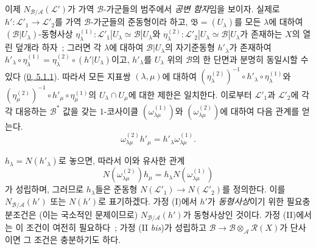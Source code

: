 \begin{env}[6.5.3]
\label{II.6.5.3-ko}
이제 $N_{\mathcal{B}/\mathcal{A}}(\mathcal{L}')$가 가역
$\mathcal{B}$-가군들의 범주에서 \emph{공변 함자}임을 보이자. 실제로
$h':\mathcal{L}'_1\to\mathcal{L}'_2$를 가역 $\mathcal{B}$-가군들의
준동형이라 하고, $\mathfrak{B}=(U_\lambda)$를 모든 $\lambda$에 대하여
$(\mathcal{B}|U_\lambda)$-동형사상
$\eta^{(1)}_\lambda:\mathcal{L}'_1|U_\lambda\simeq\mathcal{B}|U_\lambda$와
$\eta^{(2)}_\lambda:\mathcal{L}'_2|U_\lambda\simeq\mathcal{B}|U_\lambda$가
존재하는 $X$의 열린 덮개라 하자~; 그러면 각 $\lambda$에 대하여
$\mathcal{B}|U_\lambda$의 자기준동형 $h'_\lambda$가 존재하여
$h'_\lambda\circ\eta^{(1)}_\lambda
=\eta^{(2)}_\lambda\circ(h'|U_\lambda)$이고, $h'_\lambda$를
$U_\lambda$ 위의 $\mathcal{B}$의 한 단면과 분명히 동일시할 수 있다
(\hyperref[0.5.1.1-ko]{0, 5.1.1}). 따라서 모든 지표쌍 $(\lambda,\mu)$에
대하여 $(\eta^{(2)}_\lambda)^{-1}\circ h'_\lambda\circ
\eta^{(1)}_\lambda$와 $(\eta^{(2)}_\mu)^{-1}\circ h'_\mu\circ
\eta^{(1)}_\mu$의 $U_\lambda\cap U_\mu$에 대한 제한은 일치한다. 이로부터
$\mathcal{L}'_1$과 $\mathcal{L}'_2$에 각각 대응하는 $\mathcal{B}^*$ 값을
갖는 $1$-코사이클 $(\omega^{(1)}_{\lambda\mu})$와
$(\omega^{(2)}_{\lambda\mu})$에 대하여 다음 관계를 얻는다.
\[
\omega^{(2)}_{\lambda\mu}h'_\mu
=h'_\lambda\omega^{(1)}_{\lambda\mu}.
\]


$h_\lambda=N(h'_\lambda)$로 놓으면, 따라서 이와 유사한 관계
\[
N(\omega^{(2)}_{\lambda\mu})h_\mu
=h_\lambda N(\omega^{(1)}_{\lambda\mu})
\]
가 성립하며, 그러므로 $h_\lambda$들은 준동형
$N(\mathcal{L}'_1)\to N(\mathcal{L}'_2)$를 정의한다. 이를
$N_{\mathcal{B}/\mathcal{A}}(h')$ 또는 $N(h')$로 표기하겠다. 가정 (I)에서
$h'$가 \emph{동형사상}이기 위한 필요충분조건은 (이는 국소적인 문제이므로)
$N_{\mathcal{B}/\mathcal{A}}(h')$가 동형사상인 것이다. 가정 (II)에서는
이 조건이 여전히 필요하다~; 가정 (II \emph{bis})가 성립하고
$\mathcal{B}\to\mathcal{B}\otimes_{\mathcal{A}}\mathcal{R}(X)$가 단사이면
그 조건은 충분하기도 하다.


\end{env}

